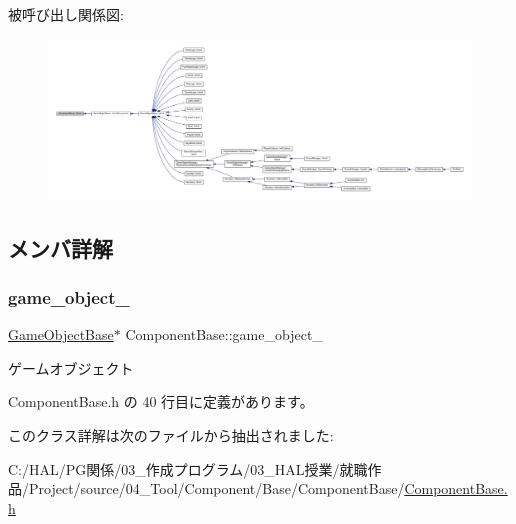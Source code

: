 被呼び出し関係図\+:
\nopagebreak
\begin{figure}[H]
\begin{center}
\leavevmode
\includegraphics[width=350pt]{class_component_base_a9f42beaf0383d6f629819579cab4de57_icgraph}
\end{center}
\end{figure}


\subsection{メンバ詳解}
\mbox{\label{class_component_base_a60a43b42437cd5be2b05d2f4f4dd8147}} 
\subsubsection{\texorpdfstring{game\+\_\+object\+\_\+}{game\_object\_}}
{\footnotesize\ttfamily \mbox{\hyperlink{class_game_object_base}{Game\+Object\+Base}}$\ast$ Component\+Base\+::game\+\_\+object\+\_\+\hspace{0.3cm}{\ttfamily [private]}}



ゲームオブジェクト 



 Component\+Base.\+h の 40 行目に定義があります。



このクラス詳解は次のファイルから抽出されました\+:\begin{DoxyCompactItemize}
\item 
C\+:/\+H\+A\+L/\+P\+G関係/03\+\_\+作成プログラム/03\+\_\+\+H\+A\+L授業/就職作品/\+Project/source/04\+\_\+\+Tool/\+Component/\+Base/\+Component\+Base/\mbox{\hyperlink{_component_base_8h}{Component\+Base.\+h}}\end{DoxyCompactItemize}
